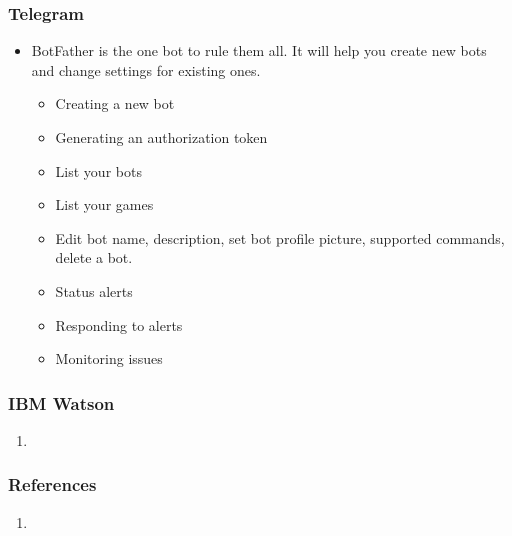 \documentclass[11pt]{beamer}
\begin{document}
\begin{frame}
\frametitle{Telegram}
\begin{itemize}
	\item BotFather is the one bot to rule them all. It will help you create new bots and change settings for existing ones.
	\begin{itemize}
		\item Creating a new bot
		\item Generating an authorization token
		\item List your bots
		\item List your games
		\item Edit bot name, description, set bot profile picture, supported commands, delete a bot.
		\item Status alerts
		\item Responding to alerts
		\item Monitoring issues
	\end{itemize}
\end{itemize}
\end{frame}


%
%

\begin{frame}
\frametitle{IBM Watson}
\begin{enumerate}
	\item 
\end{enumerate}
\end{frame}

\begin{frame}
\frametitle{References}
\begin{enumerate}
	\item 
\end{enumerate}
\end{frame}
\end{document}
